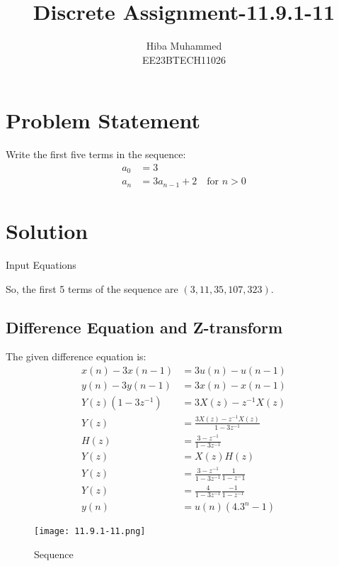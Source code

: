 \documentclass[12pt]{article}
\title{Discrete Assignment-11.9.1-11}
\author{Hiba Muhammed \\
        EE23BTECH11026}
\date{}
\begin{document}
\maketitle

\section*{Problem Statement}
Write the first five terms in the sequence:
\begin{align}
a_{0}  &= 3 \\
a_{n}  &= 3a_{n-1} + 2 \quad \text{for } n > 0
\end{align}

\section*{Solution}

\begin{table}[h]
  \centering
  
  \caption{Input Equations}
  \label{tab:input-equations}
\end{table}

So, the first 5 terms of the sequence are \( (3, 11, 35, 107, 323) \).

\subsection*{Difference Equation and Z-transform}

The given difference equation is:
\begin{align}
x(n) - 3x(n-1) &= 3u(n) - u(n-1) \\
y(n) - 3y(n-1) &= 3x(n) - x(n-1)\\
Y(z)(1 - 3z^{-1}) &= 3X(z) - z^{-1}X(z) \\
Y(z) &= \frac{3X(z) - z^{-1}X(z)}{1 - 3z^{-1}}\\
H(z) &= \frac{3 - z^{-1}}{1 - 3z^{-1}}\\
Y(z) &=X(z)H(z) \\
Y(z)&=\frac{3 - z^{-1}}{1 - 3z^{-1}}\frac{1}{1-z^-1}\\
Y(z)&=\frac{4}{1-3z^{-1}}\frac{-1}{1-z^{-1}}\\
y(n)&=u(n)(4.3^{n}-1)
\end{align}

\begin{figure}[h]
    \centering
    \texttt{[image: 11.9.1-11.png]}
    \caption{Sequence}
\end{figure}
\end{document}
